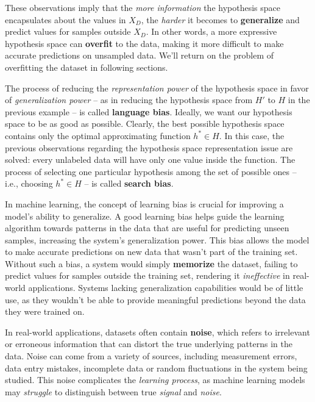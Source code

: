 \documentclass[a4paper, 12pt]{report}
\begin{document}
    These observations imply that the \textit{more information} the hypothesis space encapsulates about the values in $X_D$, the \textit{harder} it becomes to \textbf{generalize} and predict values for samples outside $X_D$. In other words, a more expressive hypothesis space can \textbf{overfit} to the data, making it more difficult to make accurate predictions on unsampled data. We'll return on the problem of overfitting the dataset in following sections.

    The process of reducing the \textit{representation power} of the hypothesis space in favor of \textit{generalization power} -- as in reducing the hypothesis space from $H'$ to $H$ in the previous example -- is called \textbf{language bias}. Ideally, we want our hypothesis space to be as good as possible. Clearly, the best possible hypothesis space contains only the optimal approximating function $h^* \in H$. In this case, the previous observations regarding the hypothesis space representation issue are solved: every unlabeled data will have only one value inside the function. The process of selecting one particular hypothesis among the set of possible ones -- i.e., choosing $h^* \in H$ -- is called \textbf{search bias}.

    In machine learning, the concept of learning bias is crucial for improving a model's ability to generalize. A good learning bias helps guide the learning algorithm towards patterns in the data that are useful for predicting unseen samples, increasing the system's generalization power. This bias allows the model to make accurate predictions on new data that wasn't part of the training set. Without such a bias, a system would simply \textbf{memorize} the dataset, failing to predict values for samples outside the training set, rendering it \textit{ineffective} in real-world applications. Systems lacking generalization capabilities would be of little use, as they wouldn't be able to provide meaningful predictions beyond the data they were trained on.

    In real-world applications, datasets often contain \textbf{noise}, which refers to irrelevant or erroneous information that can distort the true underlying patterns in the data. Noise can come from a variety of sources, including measurement errors, data entry mistakes, incomplete data or random fluctuations in the system being studied. This noise complicates the \textit{learning process}, as machine learning models may \textit{struggle} to distinguish between true \textit{signal} and \textit{noise}.
\end{document}
